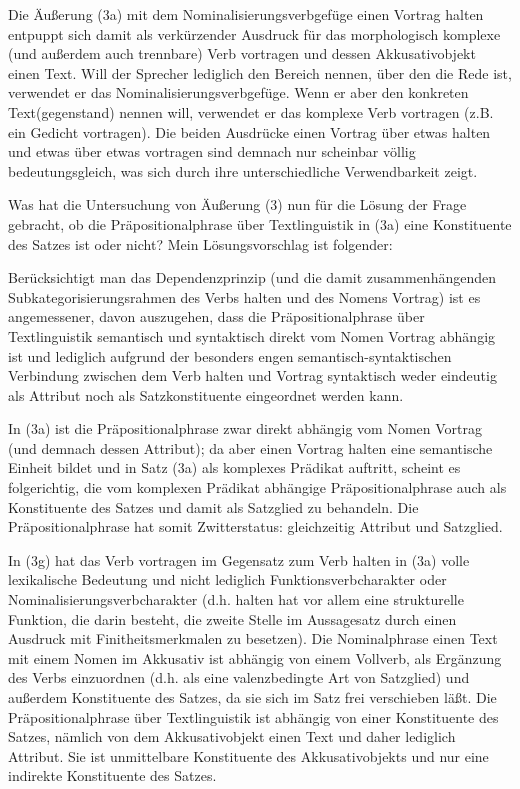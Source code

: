 \documentclass[
]{article}
\begin{document}
Die Äußerung (3a) mit dem Nominalisierungsverbgefüge einen Vortrag halten entpuppt sich damit als verkürzender Ausdruck für das morphologisch komplexe (und außerdem auch trennbare) Verb vortragen und dessen Akkusativobjekt einen Text. Will der Sprecher lediglich den Bereich nennen, über den die Rede ist, verwendet er das Nominalisierungsverbgefüge. Wenn er aber den konkreten Text(gegenstand) nennen will, verwendet er das komplexe Verb vortragen (z.B. ein Gedicht vortragen). Die beiden Ausdrücke einen Vortrag über etwas halten und etwas über etwas vortragen sind demnach nur scheinbar völlig bedeutungsgleich, was sich durch ihre unterschiedliche Verwendbarkeit zeigt.

Was hat die Untersuchung von Äußerung (3) nun für die Lösung der Frage gebracht, ob die Präpositionalphrase über Textlinguistik in (3a) eine Konstituente des Satzes ist oder nicht? Mein Lösungsvorschlag ist folgender:

Berücksichtigt man das Dependenzprinzip (und die damit zusammenhängenden Subkategorisierungsrahmen des Verbs halten und des Nomens Vortrag) ist es angemessener, davon auszugehen, dass die Präpositionalphrase über Textlinguistik semantisch und syntaktisch direkt vom Nomen Vortrag abhängig ist und lediglich aufgrund der besonders engen semantisch-syntaktischen Verbindung zwischen dem Verb halten und Vortrag syntaktisch weder eindeutig als Attribut noch als Satzkonstituente eingeordnet werden kann.

In (3a) ist die Präpositionalphrase zwar direkt abhängig vom Nomen Vortrag (und demnach dessen Attribut); da aber einen Vortrag halten eine semantische Einheit bildet und in Satz (3a) als komplexes Prädikat auftritt, scheint es folgerichtig, die vom komplexen Prädikat abhängige Präpositionalphrase auch als Konstituente des Satzes und damit als Satzglied zu behandeln. Die Präpositionalphrase hat somit Zwitterstatus: gleichzeitig Attribut und Satzglied.

In (3g) hat das Verb vortragen im Gegensatz zum Verb halten in (3a) volle lexikalische Bedeutung und nicht lediglich Funktionsverbcharakter oder Nominalisierungsverbcharakter (d.h. halten hat vor allem eine strukturelle Funktion, die darin besteht, die zweite Stelle im Aussagesatz durch einen Ausdruck mit Finitheitsmerkmalen zu besetzen). Die Nominalphrase einen Text mit einem Nomen im Akkusativ ist abhängig von einem Vollverb, als Ergänzung des Verbs einzuordnen (d.h. als eine valenzbedingte Art von Satzglied) und außerdem Konstituente des Satzes, da sie sich im Satz frei verschieben läßt. Die Präpositionalphrase über Textlinguistik ist abhängig von einer Konstituente des Satzes, nämlich von dem Akkusativobjekt einen Text und daher lediglich Attribut. Sie ist unmittelbare Konstituente des Akkusativobjekts und nur eine indirekte Konstituente des Satzes.
\end{document}
